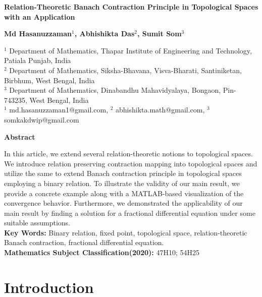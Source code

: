 \documentclass[10pt, reqno]{amsart}
\theoremstyle{definition}
\theoremstyle{remark}
\numberwithin{equation}{section}
\begin{document}
	\begin{center}
		{\large\textbf{Relation-Theoretic Banach Contraction Principle in Topological Spaces with an Application}}
	\end{center}
	\bigskip
	\begin{center}
		\textbf{Md Hasanuzzaman$^{1}$, Abhishikta Das$^{2}$, Sumit Som$^{3}$}
	\end{center}
	\begin{center}
		
		$^{1}$ Department of Mathematics, Thapar Institute of Engineering and Technology, Patiala Punjab, India\\
        $^{2}$ Department of Mathematics, Siksha-Bhavana, Visva-Bharati, Santiniketan, Birbhum, West Bengal, India \\
		$^{3}$ Department of Mathematics, Dinabandhu Mahavidyalaya, Bongaon, Pin-743235, West Bengal, India\\
		$^{1}$ md.hasanuzzaman1@gmail.com, $^{2}$ abhishikta.math@gmail.com, $^{3}$ somkakdwip@gmail.com
		\bigskip
		
		\textbf{Abstract}
	\end{center}
In this article, we extend several relation-theoretic notions to topological spaces. We introduce relation preserving contraction mapping into topological spaces and utilize the same to extend Banach contraction principle in  topological spaces employing a binary relation. 
 To illustrate the validity of our main result, we provide a concrete example along with a MATLAB-based visualization of the convergence behavior.
Furthermore, we demonstrated the applicability of our main result by finding a solution for a fractional differential equation under some suitable assumptions.\\

\noindent\textbf{Key Words:}  Binary relation, fixed point, topological space, relation-theoretic Banach contraction, fractional differential equation.\\
%
\noindent\textbf{Mathematics Subject Classification(2020):} 47H10; 54H25

\section{Introduction}
 
\end{document}
